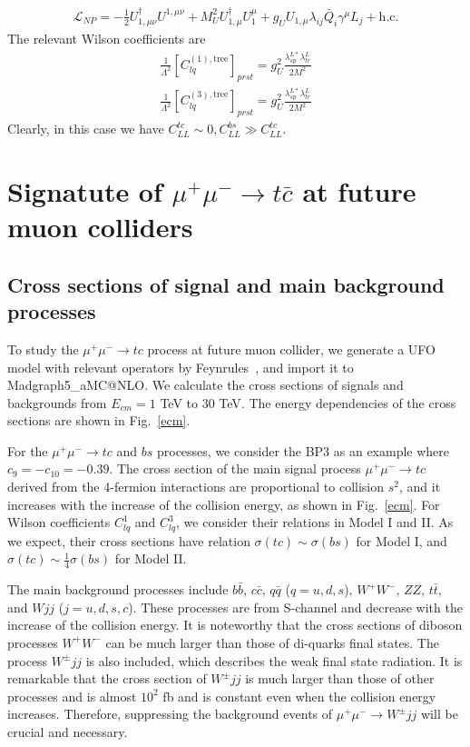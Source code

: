 \documentclass[a4paper,11pt]{article}
\makeatletter
\newcommand{\mgamc}{Madgraph5\_aMC@NLO}
\makeatother
\begin{document}
\begin{enumerate}
\begin{align}
        \mathcal{L}_{NP}=-\frac{1}{2}U_{1,\mu\nu}^{\dag}U^{1,\mu\nu}+M_U^2U_{1,\mu}^{\dag}U_1^{\mu}+g_UU_{1,\mu}\lambda_{ij}\bar{Q}_{i}\gamma^{\mu}L_{j}+\textrm{h.c.}
        \end{align}
        The relevant Wilson coefficients are
        \begin{align}
            \frac{1}{\Lambda^2}[C_{lq}^{(1),\textrm{tree}}]_{prst}=g_U^2\frac{\lambda_{sp}^{L*}\lambda_{tr}^{L}}{2M^2}\\
            \frac{1}{\Lambda^2}[C_{lq}^{(3),\textrm{tree}}]_{prst}=g_U^2\frac{\lambda_{sp}^{L*}\lambda_{tr}^{L}}{2M^2}
        \end{align}
        Clearly, in this case we have $C_{LL}^{tc}\sim0,C_{LL}^{bs}\gg C_{LL}^{tc}$.
\end{enumerate}

\section{Signatute of $\mu^+\mu^-\to t\bar{c}$ at future muon colliders }
\label{Sec:result}

\subsection{Cross sections of signal and main background processes}
To study the $\mu^+\mu^-\to tc$ process at future muon collider, 
we generate a UFO model with relevant operators by Feynrules~\cite{Alloul:2013bka}, 
and import it to \mgamc \cite{Alwall:2014hca}. 
We calculate the cross sections of signals and backgrounds from $E_{cm}=1$ TeV to $30$ TeV.  
The energy dependencies of the cross sections are shown in Fig.~\ref{ecm}. 

For the $\mu^+\mu^-\to tc$ and $bs$ processes, we consider the BP3 as an example where $c_{9}=-c_{10}=-0.39$. The cross section of the main signal process $\mu^+ \mu^- \to tc$ derived from the 4-fermion interactions are proportional to collision $s^2$, 
and it increases with the increase of the collision energy, as shown in Fig.~\ref{ecm}. 
For Wilson coefficients $C^{1}_{lq}$ and $C^{3}_{lq}$, we consider their relations in Model I and II. 
As we expect, their cross sections have relation $\sigma(tc)\sim \sigma(bs)$ for Model I, and $\sigma(tc)\sim\frac{1}{4}\sigma(bs)$ for Model II. 

The main background processes include $b\bar{b}$, $c\bar{c}$, $q\bar{q}$ ($q=u,d,s$), $W^+ W^-$, $ZZ$, $t \bar{t}$, and $Wjj$ ($j=u,d,s,c$). 
These processes are from S-channel and decrease with the increase of the collision energy. 
It is noteworthy that the cross sections of diboson processes $W^+W^-$ can be much larger than those of di-quarks final states. 
The process $W^\pm jj$ is also included, which describes the weak final state radiation. 
It is remarkable that the cross section of $W^\pm jj$ is much larger than those of other processes and is almost $10^2$ fb and is constant even when the collision energy increases. 
Therefore, suppressing the background events of $\mu^+ \mu^- \to W^\pm jj$ will be crucial and necessary.
\end{document}
